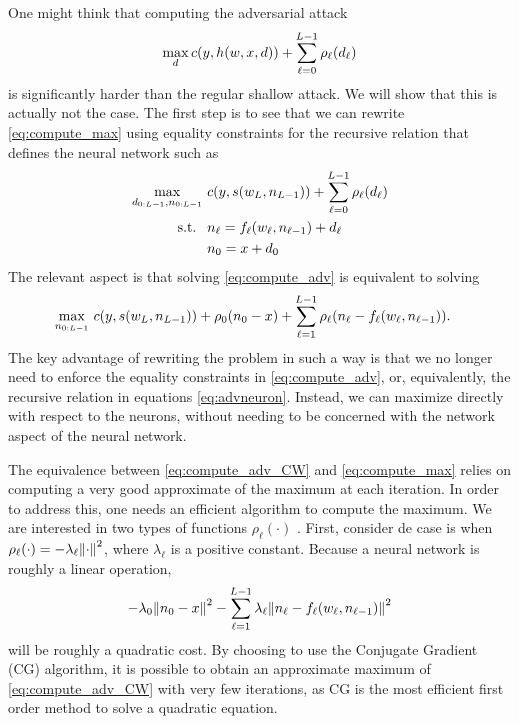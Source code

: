 \documentclass[11pt,letterpaper,DIV=17]{scrartcl}
\newcommand{\st}{\text{ s.t. }}
\renewcommand{\l}[1][]{_{\ell#1}}
\renewcommand{\L}[1][]{_{L#1}}
\newcommand{\s}{s\qty}
\renewcommand{\c}{c\qty}
\newcommand{\f}{f\l\qty}
\begin{document}
One might think that computing the adversarial attack
\begin{equation} \label{eq:compute_max}
\max_{d}\c(y,h(w,x,d))+\sum_{\ell=0}^{L-1}\rho\l(d\l)
\end{equation}
is significantly harder than the regular shallow attack. We will show that this is actually not the case. The first step is to see that we can rewrite \eqref{eq:compute_max} using equality constraints for the recursive relation that defines the neural network such as
\begin{equation} \label{eq:compute_adv}
\begin{split}
\max_{d_{0:L-1},n_{0:L-1}}&\ \c(y,\s(w\L,n\L[-1]))+\sum_{\ell=0}^{L-1}\rho\l(d\l)
\\\st &\  n\l=\f(w\l,n\l[-1])+d\l
\\ &\ n_{0}=x+d_{0}
\end{split}
\end{equation}
The relevant aspect is that solving \eqref{eq:compute_adv} is equivalent to solving
\begin{equation} \label{eq:compute_adv_CW}
\begin{split}
\max_{n_{0:L-1}}&\ \c(y,\s(w\L,n\L[-1]))+\rho_{0}(n_0-x)+\sum_{\ell=1}^{L-1}\rho\l(n\l-\f(w\l,n\l[-1])).
\end{split}
\end{equation}
The key advantage of rewriting the problem in such a way is that we no longer need to enforce the equality constraints in \eqref{eq:compute_adv}, or, equivalently, the recursive relation in equations \eqref{eq:advneuron}. Instead, we can maximize directly with respect to the neurons, without needing to be concerned with the network aspect of the neural network.


The equivalence between \eqref{eq:compute_adv_CW} and \eqref{eq:compute_max} relies on computing a very good approximate of the maximum at each iteration. In order to address this, one needs an efficient algorithm to compute the maximum. We are interested in two types of functions $\rho_\ell(\cdot)$ . First, consider de case is when $\rho_\ell(\cdot)=-\lambda_\ell\norm{\cdot}^2$, where $\lambda_\ell$ is a positive constant. Because a neural network is roughly a linear operation, 
$$
-\lambda_0\norm{n_0-x}^2-\sum_{\ell=1}^{L-1}\lambda_\ell\norm{n\l-\f(w\l,n\l[-1])}^2
$$
will be roughly a quadratic cost. By choosing to use the Conjugate Gradient (CG) algorithm, it is possible to obtain an approximate maximum of \eqref{eq:compute_adv_CW} with very few iterations, as CG is the most efficient first order method to solve a quadratic equation.
\end{document}

